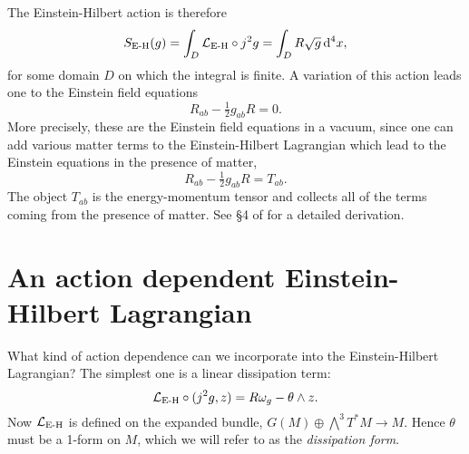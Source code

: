 \documentclass[../main.tex]{subfiles}
\begin{document}
The Einstein-Hilbert action is therefore
\begin{equation} \label{eq:EH action}
	S_{\text{E-H}}(g) = \int_D \mathcal{L}_\text{E-H} \circ j^2g = \int_D R
	\sqrt{g}\,\mathrm{d}^4x,
\end{equation}
for some domain \(D\) on which the integral is finite. 
A variation of this action leads one to the Einstein field equations 
\begin{equation} \label{eq:EFE vacuum}
	R_{ab} - \tfrac{1}{2}g_{ab}R = 0. 
\end{equation}
More precisely, these are the Einstein field equations in a vacuum, since one can add
various matter terms to the Einstein-Hilbert Lagrangian which lead to the Einstein
equations in the presence of matter,
\begin{equation} \label{eq:EFE matter}
	R_{ab} - \tfrac{1}{2}g_{ab}R = T_{ab}. 
\end{equation}
The object \( T_{ab} \) is the energy-momentum tensor and collects all of the terms coming
from the presence of matter. See \S4 of \cite{Carroll1997} for a detailed derivation.

\section{An action dependent Einstein-Hilbert Lagrangian}
What kind of action dependence can we incorporate into the Einstein-Hilbert Lagrangian?
The simplest one is a linear dissipation term:
\begin{equation} \label{eq:action dependent einstein-hilbert}
	\mathcal{L}_{\text{E-H}} \circ (j^2 g,z) = R\omega_g - \theta \wedge z. 
\end{equation}
Now \( \mathcal{L}_{\text{E-H}} \) is defined on the expanded bundle, \( G(M) \oplus \bigwedge^3T^\ast M \to M \). Hence \( \theta \) must be a 1-form on \(M\), which we will refer to as the \emph{dissipation form}.
\end{document}
